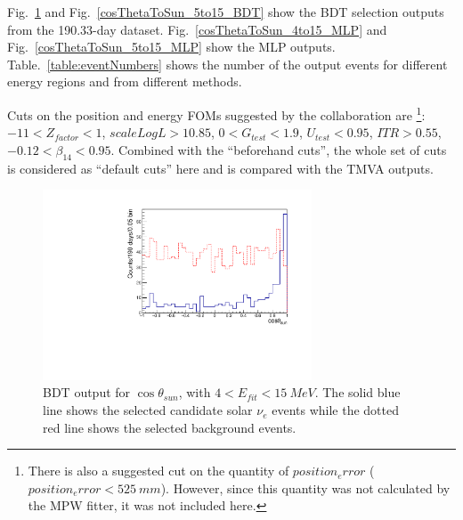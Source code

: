 Fig.~\ref{cosThetaToSun_4to15_BDT} and Fig.~\ref{cosThetaToSun_5to15_BDT} show the BDT selection outputs from the 190.33-day dataset. Fig.~\ref{cosThetaToSun_4to15_MLP} and Fig.~\ref{cosThetaToSun_5to15_MLP} show the MLP outputs. 
Table.~\ref{table:eventNumbers} shows the number of the output events for different energy regions and from different methods.

Cuts on the position and energy FOMs suggested by the collaboration\cite{morganFOM} are \footnote{There is also a suggested cut on the quantity of $position_error$ ($position_error<525~mm$). However, since this quantity was not calculated by the MPW fitter, it was not included here.}: $-11<Z_{factor}<1$, $scaleLogL>10.85$, $0<G_{test}<1.9$, $U_{test}<0.95$, $ITR>0.55$, $-0.12<\beta_{14}<0.95$. Combined with the ``beforehand cuts'', the whole set of cuts is considered as ``default cuts'' here and is compared with the TMVA outputs.

%

\begin{figure}[!htb]
	\centering
	\includegraphics[width=8cm]{cosThetaToSun_4to15_BDT.pdf}
	\caption{BDT output for $\cos\theta_{sun}$, with $4<E_{fit}<15~MeV$. The solid blue line shows the selected candidate solar $\nu_e$ events while the dotted red line shows the selected background events.}
	\label{cosThetaToSun_4to15_BDT}
\end{figure}

